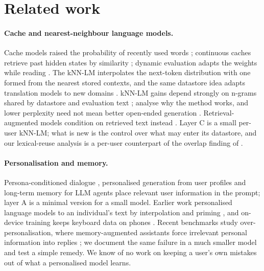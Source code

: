 \documentclass[10pt,twocolumn]{article}
\begin{document}
\section{Related work}\label{sec:related}

\paragraph{Cache and nearest-neighbour language models.} Cache models raised the probability of recently used words
\citep{kuhn1990cache}; continuous caches retrieve past hidden states by similarity \citep{grave2017cache}; dynamic
evaluation adapts the weights while reading \citep{krause2018dynamic}. The kNN-LM \citep{khandelwal2020knnlm}
interpolates the next-token distribution with one formed from the nearest stored contexts, and the same datastore idea
adapts translation models to new domains \citep{khandelwal2021knnmt}. kNN-LM gains depend strongly on n-grams shared by
datastore and evaluation text \citep{drozdov2022knnlm}; \citet{xu2023knnlm} analyse why the method works, and lower
perplexity need not mean better open-ended generation \citep{wang2023knnlm}. Retrieval-augmented models condition on
retrieved text instead \citep{lewis2020rag,borgeaud2022retro}. Layer C is a small per-user kNN-LM; what is new is the
control over what may enter its datastore, and our lexical-reuse analysis is a per-user counterpart of the overlap
finding of \citet{drozdov2022knnlm}.

\paragraph{Personalisation and memory.} Persona-conditioned dialogue \citep{zhang2018personachat}, personalised
generation from user profiles \citep{salemi2024lamp} and long-term memory for LLM agents
\citep{packer2023memgpt,zhong2024memorybank,park2023generative} place relevant user information in the prompt; layer A
is a minimal version for a small model. Earlier work personalised language models to an individual's text by
interpolation and priming \citep{king2020personalizing}, and on-device training keeps keyboard data on phones
\citep{hard2018federated}. Recent benchmarks study over-personalisation, where memory-augmented assistants force
irrelevant personal information into replies \citep{hu2026opbench,feng2026rpeval}; we document the same failure in a
much smaller model and test a simple remedy. We know of no work on keeping a user's own mistakes out of what a
personalised model learns.
\end{document}

